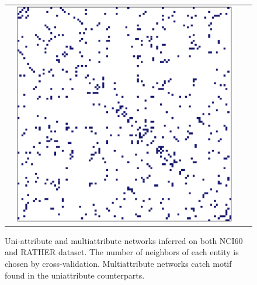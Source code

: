 \begin{frame}
\begin{figure}[htbp!]
\begin{tabular}{@{}lccc@{}}
    & \includegraphics[width=.25\textwidth]{../../chapter/figures/bivarNet_RATHER} \\
  \end{tabular}
  \caption{Uni-attribute and multiattribute networks inferred on both
    NCI60 and RATHER dataset. The number of neighbors of each entity
    is chosen by cross-validation. Multiattribute networks catch motif
    found in the uniattribute counterparts.}
  \label{fig:networks}
\end{figure}

\end{frame}
